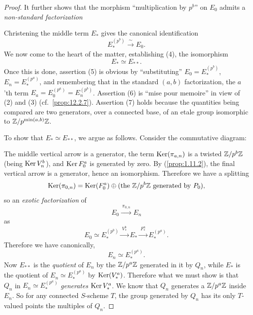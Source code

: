 \begin{proof}
It further shows that the morphism ``multiplication by $p^b$'' on $E_0$ admits a \emph{non-standard factorization}
\begin{center}
\end{center}
Christening the middle term $E_*$ gives the canonical identification
\[
E_*^{(p^b)} \xrightarrow{\ \sim\ } E_0 .
\]
We now come to the heart of the matter, establishing (4), the isomorphism
\[
E_* \simeq E_{**} .
\]
Once this is done, assertion (5) is obvious by ``substituting'' $E_0 = E_*^{(p^b)}$, $E_n = E_*^{(p^a)}$, and remembering that in the standard $(a,b)$ factorization, the $a$'th term $E_a = E_0^{(p^a)} = E_n^{(p^b)}$. Assertion (6) is ``mise pour memoire'' in view of (2) and (3) (cf.\ \ref{prop:12.2.7}). Assertion (7) holds because the quantities being compared are two generators, over a connected base, of an etale group isomorphic to $\mathbb{Z}/p^{\min(a,b)}\mathbb{Z}$.

To show that $E_* \simeq E_{**}$, we argue as follows. Consider the commutative diagram:
\begin{center}
\end{center}
The middle vertical arrow is a generator, the term $\operatorname{Ker}(\pi_{a,n})$ is a twisted $\mathbb{Z}/p^b\mathbb{Z}$ (being $\operatorname{Ker} V_n^b$), and $\operatorname{Ker} F_0^a$ is generated by zero. By (\ref{prop:1.11.2}), the final vertical arrow is a generator, hence an isomorphism. Therefore we have a splitting
\[
\operatorname{Ker}(\pi_{0,n}) = \operatorname{Ker}(F_0^a) \oplus (\text{the } \mathbb{Z}/p^b\mathbb{Z} \text{ generated by } P_0) ,
\]
so an \emph{exotic factorization} of
\[
E_0 \xrightarrow{\ \pi_{0,n}\ } E_n
\]
as
\[
E_0 \simeq E_*^{(p^b)} \xrightarrow{\ V_*^b\ } E_* \xrightarrow{\ F_*^a\ } E_*^{(p^a)} .
\]
Therefore we have canonically,
\[
E_n \simeq E_*^{(p^a)} .
\]
Now $E_{**}$ is the \emph{quotient} of $E_n$ by the $\mathbb{Z}/p^a\mathbb{Z}$ generated in it by $Q_n$, while $E_*$ is the quotient of $E_n \simeq E_*^{(p^a)}$ by $\operatorname{Ker}(V_*^a)$. Therefore what we must show is that $Q_n$ in $E_n \simeq E_*^{(p^a)}$ \emph{generates} $\operatorname{Ker} V_*^a$. We know that $Q_n$ generates a $\mathbb{Z}/p^a\mathbb{Z}$ inside $E_n$. So for any connected $S$-scheme $T$, the group generated by $Q_n$ has its only $T$-valued points the multiples of $Q_n$.


\end{proof}
